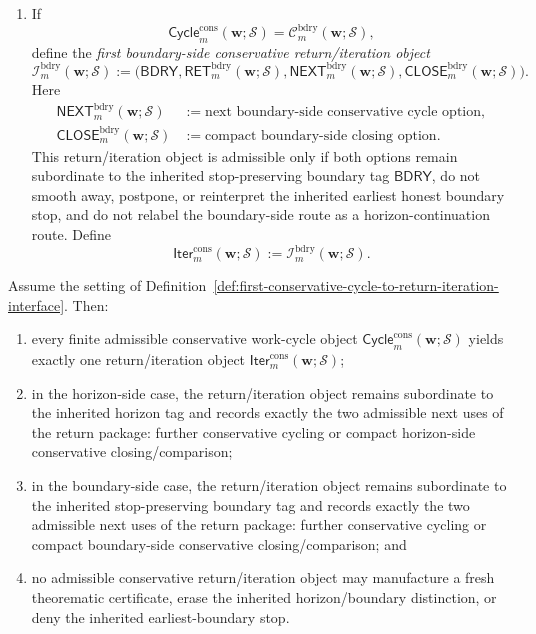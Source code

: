 \begin{definition}
\begin{enumerate}[label=(\roman*)]
 \item If
 {\small
\[
 \mathsf{Cycle}^{\mathrm{cons}}_{m}(\mathbf w;\mathcal S)
 =
 \mathcal C^{\mathrm{bdry}}_{m}(\mathbf w;\mathcal S),
 \]
}
define the \emph{first boundary-side conservative return/iteration object}
\[
 \mathcal I^{\mathrm{bdry}}_{m}(\mathbf w;\mathcal S)
 :=
 \bigl(
 \mathsf{BDRY},
 \mathsf{RET}^{\mathrm{bdry}}_{m}(\mathbf w;\mathcal S),
 \mathsf{NEXT}^{\mathrm{bdry}}_{m}(\mathbf w;\mathcal S),
 \mathsf{CLOSE}^{\mathrm{bdry}}_{m}(\mathbf w;\mathcal S)
 \bigr).
\]
Here
\begin{align*}
 \mathsf{NEXT}^{\mathrm{bdry}}_{m}(\mathbf w;\mathcal S)
 &:= \text{next boundary-side conservative cycle option},\\
 \mathsf{CLOSE}^{\mathrm{bdry}}_{m}(\mathbf w;\mathcal S)
 &:= \text{compact boundary-side closing option}.
\end{align*}
This return/iteration object is admissible only if both options remain subordinate to the inherited stop-preserving boundary tag \(\mathsf{BDRY}\), do not smooth away, postpone, or reinterpret the inherited earliest honest boundary stop, and do not relabel the boundary-side route as a horizon-continuation route. Define
\[
 \mathsf{Iter}^{\mathrm{cons}}_{m}(\mathbf w;\mathcal S)
 :=
 \mathcal I^{\mathrm{bdry}}_{m}(\mathbf w;\mathcal S).
\]
\end{enumerate}
\end{definition}

\begin{proposition}
\label{prop:every-finite-admissible-conservative-work-cycle-yields-exactly-one-conservative-return-iteration-object}
Assume the setting of Definition~\ref{def:first-conservative-cycle-to-return-iteration-interface}. Then:
\begin{enumerate}[label=(\roman*)]
 \item every finite admissible conservative work-cycle object \(\mathsf{Cycle}^{\mathrm{cons}}_{m}(\mathbf w;\mathcal S)\) yields exactly one return/iteration object \(\mathsf{Iter}^{\mathrm{cons}}_{m}(\mathbf w;\mathcal S)\);
 \item in the horizon-side case, the return/iteration object remains subordinate to the inherited horizon tag and records exactly the two admissible next uses of the return package: further conservative cycling or compact horizon-side conservative closing/comparison;
 \item in the boundary-side case, the return/iteration object remains subordinate to the inherited stop-preserving boundary tag and records exactly the two admissible next uses of the return package: further conservative cycling or compact boundary-side conservative closing/comparison; and
 \item no admissible conservative return/iteration object may manufacture a fresh theorematic certificate, erase the inherited horizon/boundary distinction, or deny the inherited earliest-boundary stop.
\end{enumerate}
\end{proposition}


